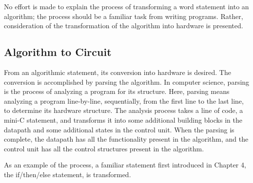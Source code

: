 No effort is made to explain the process of transforming a word statement
into an algorithm; the process should be a familiar task from writing
programs.  Rather, consideration of the transformation
of the algorithm into hardware is presented.

\subsection{Algorithm to Circuit}
From an algorithmic statement, its conversion into hardware is desired.
The conversion  is accomplished by parsing the algorithm.  In
computer science, parsing is the process of analyzing a program for its
structure.  Here, parsing means analyzing
a program line-by-line, sequentially, from the first line to the last line, to
determine its hardware structure.  The analysis process takes a line
of code, a mini-C statement, and transforms it into some additional
building blocks in the datapath and some additional states in
the control unit.  When the parsing is complete, the datapath
has all the functionality present in the algorithm, and the control
unit has all the control structures present in the algorithm.

As an example of the process, a familiar statement first introduced
in Chapter 4, the if/then/else statement, is transformed.

